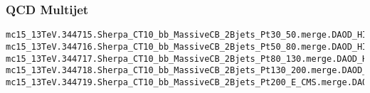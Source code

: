 \begin{scriptsize}
\subsubsection{QCD Multijet}
\fontsize{6}{7} \selectfont%

\begin{verbatim}
mc15_13TeV.344715.Sherpa_CT10_bb_MassiveCB_2Bjets_Pt30_50.merge.DAOD_HIGG5D2.e5681_a766_a821_r7676_p2949
mc15_13TeV.344716.Sherpa_CT10_bb_MassiveCB_2Bjets_Pt50_80.merge.DAOD_HIGG5D2.e5681_a766_a821_r7676_p2949
mc15_13TeV.344717.Sherpa_CT10_bb_MassiveCB_2Bjets_Pt80_130.merge.DAOD_HIGG5D2.e5681_a766_a821_r7676_p2949
mc15_13TeV.344718.Sherpa_CT10_bb_MassiveCB_2Bjets_Pt130_200.merge.DAOD_HIGG5D2.e5681_a766_a821_r7676_p2949
mc15_13TeV.344719.Sherpa_CT10_bb_MassiveCB_2Bjets_Pt200_E_CMS.merge.DAOD_HIGG5D2.e5681_a766_a821_r7676_p2949
\end{verbatim}


\end{scriptsize}
